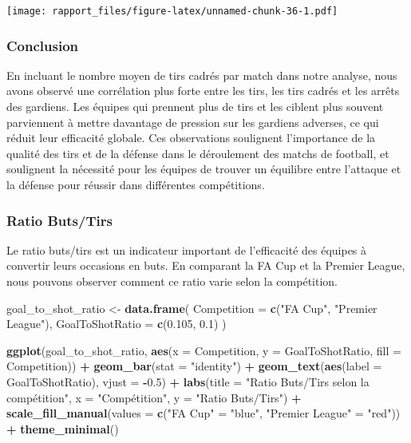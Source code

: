 \documentclass[
]{article}
\newenvironment{Shaded}{\begin{snugshade}}{\end{snugshade}}
\newcommand{\AttributeTok}[1]{\textcolor[rgb]{0.13,0.29,0.53}{#1}}
\newcommand{\FloatTok}[1]{\textcolor[rgb]{0.00,0.00,0.81}{#1}}
\newcommand{\FunctionTok}[1]{\textcolor[rgb]{0.13,0.29,0.53}{\textbf{#1}}}
\newcommand{\NormalTok}[1]{#1}
\newcommand{\OtherTok}[1]{\textcolor[rgb]{0.56,0.35,0.01}{#1}}
\newcommand{\SpecialCharTok}[1]{\textcolor[rgb]{0.81,0.36,0.00}{\textbf{#1}}}
\newcommand{\StringTok}[1]{\textcolor[rgb]{0.31,0.60,0.02}{#1}}
\begin{document}
\texttt{[image: rapport\_files/figure-latex/unnamed-chunk-36-1.pdf]}

\subsubsection{Conclusion}\label{conclusion-1}

En incluant le nombre moyen de tirs cadrés par match dans notre analyse,
nous avons observé une corrélation plus forte entre les tirs, les tirs
cadrés et les arrêts des gardiens. Les équipes qui prennent plus de tirs
et les ciblent plus souvent parviennent à mettre davantage de pression
sur les gardiens adverses, ce qui réduit leur efficacité globale. Ces
observations soulignent l'importance de la qualité des tirs et de la
défense dans le déroulement des matchs de football, et soulignent la
nécessité pour les équipes de trouver un équilibre entre l'attaque et la
défense pour réussir dans différentes compétitions.

\subsubsection{Ratio Buts/Tirs}\label{ratio-butstirs}

Le ratio buts/tirs est un indicateur important de l'efficacité des
équipes à convertir leurs occasions en buts. En comparant la FA Cup et
la Premier League, nous pouvons observer comment ce ratio varie selon la
compétition.

\begin{Shaded}
\begin{Highlighting}[]
\NormalTok{goal\_to\_shot\_ratio }\OtherTok{\textless{}{-}} \FunctionTok{data.frame}\NormalTok{(}
  \AttributeTok{Competition =} \FunctionTok{c}\NormalTok{(}\StringTok{"FA Cup"}\NormalTok{, }\StringTok{"Premier League"}\NormalTok{),}
  \AttributeTok{GoalToShotRatio =} \FunctionTok{c}\NormalTok{(}\FloatTok{0.105}\NormalTok{, }\FloatTok{0.1}\NormalTok{)}
\NormalTok{)}

\FunctionTok{ggplot}\NormalTok{(goal\_to\_shot\_ratio, }\FunctionTok{aes}\NormalTok{(}\AttributeTok{x =}\NormalTok{ Competition, }\AttributeTok{y =}\NormalTok{ GoalToShotRatio, }\AttributeTok{fill =}\NormalTok{ Competition)) }\SpecialCharTok{+}
  \FunctionTok{geom\_bar}\NormalTok{(}\AttributeTok{stat =} \StringTok{"identity"}\NormalTok{) }\SpecialCharTok{+}
  \FunctionTok{geom\_text}\NormalTok{(}\FunctionTok{aes}\NormalTok{(}\AttributeTok{label =}\NormalTok{ GoalToShotRatio), }\AttributeTok{vjust =} \SpecialCharTok{{-}}\FloatTok{0.5}\NormalTok{) }\SpecialCharTok{+}
  \FunctionTok{labs}\NormalTok{(}\AttributeTok{title =} \StringTok{"Ratio Buts/Tirs selon la compétition"}\NormalTok{,}
       \AttributeTok{x =} \StringTok{"Compétition"}\NormalTok{, }\AttributeTok{y =} \StringTok{"Ratio Buts/Tirs"}\NormalTok{) }\SpecialCharTok{+}
  \FunctionTok{scale\_fill\_manual}\NormalTok{(}\AttributeTok{values =} \FunctionTok{c}\NormalTok{(}\StringTok{"FA Cup"} \OtherTok{=} \StringTok{"blue"}\NormalTok{, }\StringTok{"Premier League"} \OtherTok{=} \StringTok{"red"}\NormalTok{)) }\SpecialCharTok{+}
  \FunctionTok{theme\_minimal}\NormalTok{()}
\end{Highlighting}
\end{Shaded}
\end{document}
